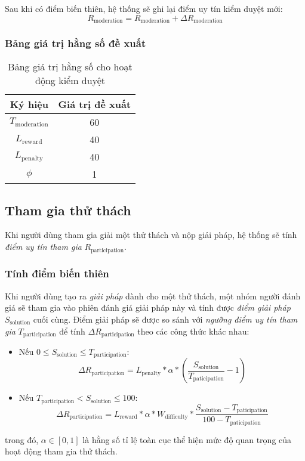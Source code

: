 Sau khi có điểm biến thiên, hệ thống sẽ ghi lại điểm uy tín kiểm duyệt mới:
\[R_{\text{moderation}} = R_{\text{moderation}} + \Delta R_{\text{moderation}}\]

\subsubsection{Bảng giá trị hằng số đề xuất}

\begin{table}[H]
  \centering
  \begin{tabular}{|c|c|}
    \hline
    \textbf{Ký hiệu}        & \textbf{Giá trị đề xuất} \\ \hline
    $T_{\text{moderation}}$ & 60                       \\ \hline
    $L_{\text{reward}}$     & 40                       \\ \hline
    $L_{\text{penalty}}$    & 40                       \\ \hline
    $\phi$                  & 1                        \\ \hline
  \end{tabular}
  \caption{Bảng giá trị hằng số cho hoạt động kiểm duyệt}
  \label{tab:suggested-constant-values-for-moderation}
\end{table}

\subsection{Tham gia thử thách}

Khi người dùng tham gia giải một thử thách và nộp giải pháp, hệ thống sẽ tính \textit{điểm uy tín tham gia} $R_{\text{participation}}$.

\subsubsection{Tính điểm biến thiên}

Khi người dùng tạo ra \textit{giải pháp} dành cho một thử thách, một nhóm người đánh giá sẽ tham gia vào phiên đánh giá giải pháp này và tính được \textit{điểm giải pháp} $S_{\text{solution}}$ cuối cùng.
Điểm giải pháp sẽ được so sánh với \textit{ngưỡng điểm uy tín tham gia} $T_{\text{participation}}$ để tính $\Delta R_{\text{participation}}$ theo các công thức khác nhau:

\begin{itemize}
  \item Nếu $0 \leq S_{\text{solution}} \leq  T_{\text{participation}}$:
        \[\Delta R_{\text{participation}} = L_{\text{penalty}} * \alpha * \left( \frac{S_{\text{solution}}}{T_{\text{paticipation}}}-1 \right)\]
  \item Nếu $T_{\text{participation}} < S_{\text{solution}} \leq 100$:
        \[\Delta R_{{\text{participation}}} = L_{\text{reward}} * \alpha*W_{\text{difficulty}} * \frac{S_{\text{solution}} - T_{\text{paticipation}}}{100-T_{\text{paticipation}}} \]
\end{itemize}
trong đó, $\alpha \in [0, 1]$ là hằng số tỉ lệ toàn cục thể hiện mức độ quan trọng của hoạt động tham gia thử thách.

